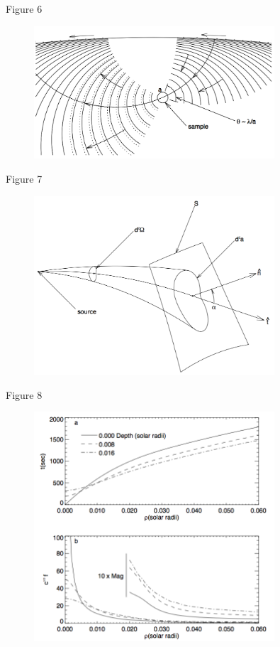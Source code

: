 \documentclass{beamer}
\begin{document}
\begin{frame}{Figure 6}
    \begin{figure}
        \includegraphics[width=0.8\textwidth]{fig_6.png}
    \end{figure}
\end{frame}

\begin{frame}{Figure 7}
    \begin{figure}
        \includegraphics[width=0.8\textwidth]{fig_7.png}
    \end{figure}
\end{frame}

\begin{frame}{Figure 8}
    \begin{figure}
        \includegraphics[width=0.8\textwidth]{fig_8.png}
    \end{figure}
\end{frame}
\end{document}
